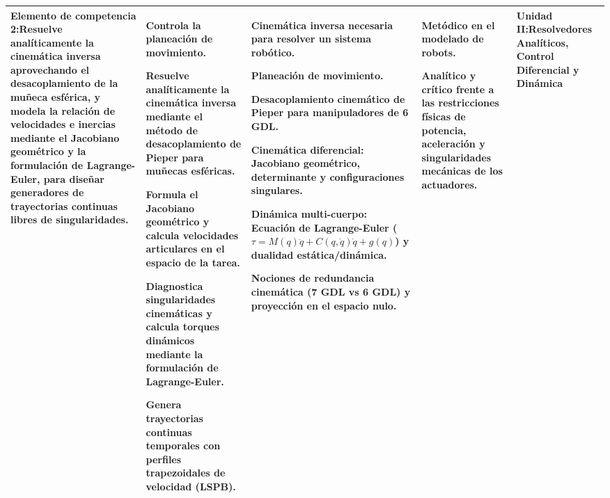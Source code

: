 \documentclass[11pt, letterpaper]{article}
\begin{document}
\begin{xltabular}{\textwidth}{|>{\raggedright\arraybackslash}p{3.5cm}|>{\raggedright\arraybackslash}X|>{\raggedright\arraybackslash}X|>{\raggedright\arraybackslash}X|>{\centering\arraybackslash}p{2.5cm}|}
\textbf{Elemento de competencia 2:}\newline Resuelve analíticamente la cinemática inversa aprovechando el desacoplamiento de la muñeca esférica, y modela la relación de velocidades e inercias mediante el Jacobiano geométrico y la formulación de Lagrange-Euler, para diseñar generadores de trayectorias continuas libres de singularidades.
& \begin{tabitemize}
    \item Controla la planeación de movimiento.
    \item Resuelve analíticamente la cinemática inversa mediante el método de desacoplamiento de Pieper para muñecas esféricas.
    \item Formula el Jacobiano geométrico y calcula velocidades articulares en el espacio de la tarea.
    \item Diagnostica singularidades cinemáticas y calcula torques dinámicos mediante la formulación de Lagrange-Euler.
    \item Genera trayectorias continuas temporales con perfiles trapezoidales de velocidad (LSPB).
\end{tabitemize}
& \begin{tabitemize}
    \item Cinemática inversa necesaria para resolver un sistema robótico.
    \item Planeación de movimiento.
    \item Desacoplamiento cinemático de Pieper para manipuladores de 6 GDL.
    \item Cinemática diferencial: Jacobiano geométrico, determinante y configuraciones singulares.
    \item Dinámica multi-cuerpo: Ecuación de Lagrange-Euler ($\tau = M(q)\ddot{q} + C(q,\dot{q})\dot{q} + g(q)$) y dualidad estática/dinámica.
    \item Nociones de redundancia cinemática (7 GDL vs 6 GDL) y proyección en el espacio nulo.
\end{tabitemize}  
& \begin{tabitemize}
    \item Metódico en el modelado de robots.
    \item Analítico y crítico frente a las restricciones físicas de potencia, aceleración y singularidades mecánicas de los actuadores.
\end{tabitemize}
& Unidad II:\newline Resolvedores Analíticos, Control Diferencial y Dinámica
\\ \hline


\end{xltabular}
\end{document}
